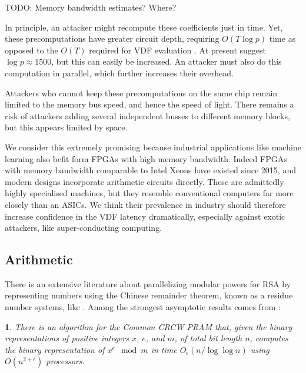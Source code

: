 \documentclass{article}
\newtheorem*{rawnamedtheorem}{\therawnamedtheorem}
\newcommand{\therawnamedtheorem}{\error}
\newenvironment{namedtheorem}[1]{\renewcommand{\therawnamedtheorem}{#1}
   \begin{rawnamedtheorem}}
  {\end{rawnamedtheorem}}
\begin{document}
TODO:  Memory bandwidth estimates?  Where?

In principle, an attacker might recompute these coefficients just in
time.  Yet, these precomputations have greater circuit depth, requiring
$O(T \log p)$ time as opposed to the $O(T)$ required for VDF evaluation
\cite[pp. 21]{cryptoeprint:2019:166}.  At present \cite[pp. 15]{cryptoeprint:2019:166} 
suggest $\log p \approx 1500$, but this can easily be increased.
An attacker must also do this computation in parallel, which further
increases their overhead.

Attackers who cannot keep these precomputations on the same chip remain
limited to the memory bus speed, and hence the speed of light. 
There remains a risk of attackers adding several independent busses to
different memory blocks, but this appears limited by space.

We consider this extremely promising because industrial applications
like machine learning also befit form FPGAs with high memory bandwidth.
Indeed FPGAs with memory bandwidth comparable to Intel Xeons have
existed since 2015, and 
modern designs incorporate arithmetic circuits directly.
These are admittedly highly specialised machines, but they resemble
conventional computers far more closely than an ASICs.
We think their prevalence in industry should therefore increase
confidence in the VDF latency dramatically, especially against
exotic attackers, like super-conducting computing.

\subsection{Arithmetic}

There is an extensive literature about parallelizing modular powers
for RSA by representing numbers using the Chinese remainder theorem,
known as a residue number systems, like \cite{RNSonGPU07,Moss07,Araujo12}.
Among the strongest asymptotic results comes from \cite{BernsteinSorenson07}:

\begin{namedtheorem}{Theorem 8.1 of \cite{BernsteinSorenson07}}
There is an algorithm for the Common CRCW PRAM that, given the binary
representations of positive integers $x$, $e$, and $m$, of total bit
length $n$, computes the binary representation of $x^e \mod m$ in time
$O_\epsilon(n / \log \log n)$ using $O(n^{2+\epsilon})$ processors.
\end{namedtheorem}
\end{document}
